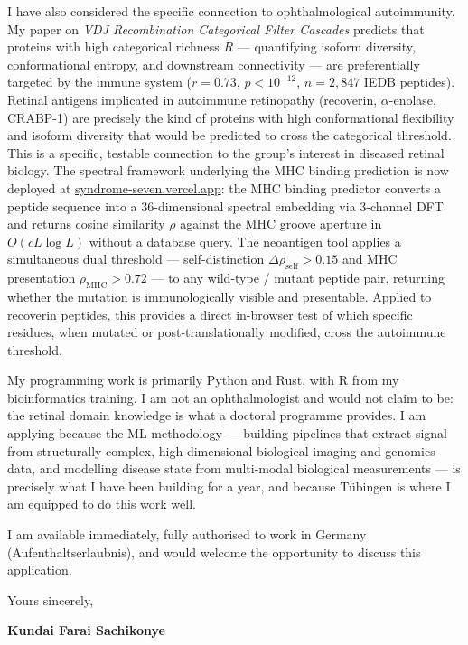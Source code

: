 \documentclass[12pt,a4paper]{article}
\begin{document}
I have also considered the specific connection to ophthalmological autoimmunity.
My paper on \textit{VDJ Recombination Categorical Filter Cascades} predicts that proteins
with high categorical richness $R$ --- quantifying isoform diversity, conformational entropy,
and downstream connectivity --- are preferentially targeted by the immune system
($r=0.73$, $p<10^{-12}$, $n=2{,}847$ IEDB peptides). Retinal antigens implicated in
autoimmune retinopathy (recoverin, $\alpha$-enolase, CRABP-1) are precisely the kind
of proteins with high conformational flexibility and isoform diversity that would be
predicted to cross the categorical threshold. This is a specific, testable connection to
the group's interest in diseased retinal biology.
The spectral framework underlying the MHC binding prediction is now deployed at
\href{https://syndrome-seven.vercel.app}{syndrome-seven.vercel.app}: the MHC binding
predictor converts a peptide sequence into a 36-dimensional spectral embedding via
3-channel DFT and returns cosine similarity $\rho$ against the MHC groove aperture
in $O(cL\log L)$ without a database query. The neoantigen tool applies a simultaneous
dual threshold --- self-distinction $\Delta\rho_\text{self} > 0.15$ and MHC presentation
$\rho_\text{MHC} > 0.72$ --- to any wild-type / mutant peptide pair, returning whether
the mutation is immunologically visible and presentable. Applied to recoverin peptides,
this provides a direct in-browser test of which specific residues, when mutated or
post-translationally modified, cross the autoimmune threshold.

My programming work is primarily Python and Rust, with R from my bioinformatics training.
I am not an ophthalmologist and would not claim to be: the retinal domain knowledge is
what a doctoral programme provides. I am applying because the ML methodology --- building
pipelines that extract signal from structurally complex, high-dimensional biological
imaging and genomics data, and modelling disease state from multi-modal biological
measurements --- is precisely what I have been building for a year, and because Tübingen
is where I am equipped to do this work well.

I am available immediately, fully authorised to work in Germany (Aufenthaltserlaubnis),
and would welcome the opportunity to discuss this application.

\vspace{1.5em}
Yours sincerely,

\vspace{2.5em}
\textbf{Kundai Farai Sachikonye}
\end{document}

